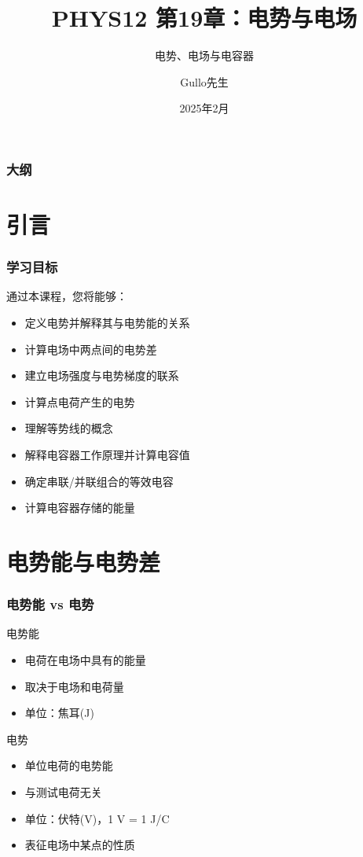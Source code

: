 \documentclass{beamer}
\title[电势与电容器]{PHYS12 第19章：电势与电场}
\subtitle{电势、电场与电容器}
\author[Gullo先生]{Gullo先生}
\date[2025年2月]{2025年2月}
\institute{物理系}
\begin{document}
\begin{frame}
    \titlepage
\end{frame}

\begin{frame}
    \frametitle{大纲}
    \tableofcontents
\end{frame}

\section{引言}

\begin{frame}
    \frametitle{学习目标}
    通过本课程，您将能够：
    \begin{itemize}
        \item 定义电势并解释其与电势能的关系
        \item 计算电场中两点间的电势差
        \item 建立电场强度与电势梯度的联系
        \item 计算点电荷产生的电势
        \item 理解等势线的概念
        \item 解释电容器工作原理并计算电容值
        \item 确定串联/并联组合的等效电容
        \item 计算电容器存储的能量
    \end{itemize}
\end{frame}

\section{电势能与电势差}

\begin{frame}
    \frametitle{电势能 vs 电势}
    
    \begin{block}{电势能}
        \begin{itemize}
            \item 电荷在电场中具有的能量
            \item 取决于电场和电荷量
            \item 单位：焦耳(J)
        \end{itemize}
    \end{block}
    
    \begin{block}{电势}
        \begin{itemize}
            \item 单位电荷的电势能
            \item 与测试电荷无关
            \item 单位：伏特(V)，1 V = 1 J/C
            \item 表征电场中某点的性质
        \end{itemize}
    \end{block}
\end{frame}
\end{document}
